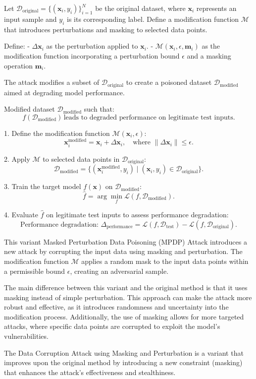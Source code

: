 Let $\mathcal{D}_{\text{original}} = \{(\mathbf{x}_i, y_i)\}_{i=1}^{N}$ be the original dataset, where $\mathbf{x}_i$ represents an input sample and $y_i$ is its corresponding label. Define a modification function $\mathcal{M}$ that introduces perturbations and masking to selected data points.

Define:
- $\Delta \mathbf{x}_i$ as the perturbation applied to $\mathbf{x}_i$.
- $\mathcal{M}(\mathbf{x}_i, \epsilon, \mathbf{m}_i)$ as the modification function incorporating a perturbation bound $\epsilon$ and a masking operation $\mathbf{m}_i$.

The attack modifies a subset of $\mathcal{D}_{\text{original}}$ to create a poisoned dataset $\mathcal{D}_{\text{modified}}$ aimed at degrading model performance. 


Modified dataset $\mathcal{D}_{\text{modified}}$ such that:
\[
f(\mathcal{D}_{\text{modified}}) \, \text{leads to degraded performance on legitimate test inputs}.
\]

1. Define the modification function $\mathcal{M}(\mathbf{x}_i, \epsilon)$:
   \[
   \mathbf{x}_i^{\text{modified}} = \mathbf{x}_i + \Delta \mathbf{x}_i, \quad \text{where } \|\Delta \mathbf{x}_i\| \leq \epsilon.
   \]

2. Apply $\mathcal{M}$ to selected data points in $\mathcal{D}_{\text{original}}$:
   \[
   \mathcal{D}_{\text{modified}} = \{(\mathbf{x}_i^{\text{modified}}, y_i) \mid (\mathbf{x}_i, y_i) \in \mathcal{D}_{\text{original}}\}.
   \]

3. Train the target model $f(\mathbf{x})$ on $\mathcal{D}_{\text{modified}}$:
   \[
   \hat{f} = \arg \min_f \mathcal{L}(f, \mathcal{D}_{\text{modified}}).
   \]

4. Evaluate $\hat{f}$ on legitimate test inputs to assess performance degradation:
   \[
   \text{Performance degradation: } \Delta_{\text{performance}} = \mathcal{L}(f, \mathcal{D}_{\text{test}}) - \mathcal{L}(f, \mathcal{D}_{\text{original}}).
   \]

This variant Masked Perturbation Data Poisoning (MPDP) Attack introduces a new attack by corrupting the input data using masking and perturbation. The modification function $\mathcal{M}$ applies a random mask to the input data points within a permissible bound $\epsilon$, creating an adversarial sample.

The main difference between this variant and the original method is that it uses masking instead of simple perturbation. This approach can make the attack more robust and effective, as it introduces randomness and uncertainty into the modification process. Additionally, the use of masking allows for more targeted attacks, where specific data points are corrupted to exploit the model's vulnerabilities.

The Data Corruption Attack using Masking and Perturbation is a variant that improves upon the original method by introducing a new constraint (masking) that enhances the attack's effectiveness and stealthiness.